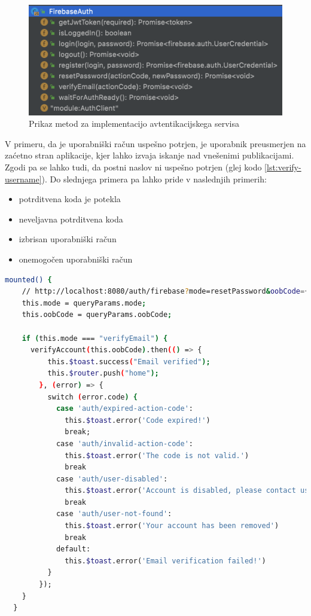 \documentclass[a4paper, 12pt]{book}
\newenvironment{myitemize}
{ \begin{itemize}
    \setlength{\itemsep}{2pt}
    \setlength{\parskip}{0pt}
    \setlength{\parsep}{2pt}     }
{ \end{itemize}                  }
\begin{document}
\begin{figure}[h]
\begin{center}
\includegraphics[width=1\textwidth]{slike/firebase_auth.png}
\end{center}
\caption{ Prikaz metod za implementacijo avtentikacijskega servisa }
\label{auth-methods}
\end{figure}

V primeru, da je uporabniški račun uspešno potrjen, je uporabnik preusmerjen na zaćetno stran aplikacije, kjer lahko izvaja iskanje nad vnešenimi publikacijami. Zgodi pa se lahko tudi, da postni naslov ni uspešno potrjen (glej kodo \ref{lst:verify-username}). Do slednjega primera pa lahko pride v naslednjih primerih:
\begin{myitemize}
  \item potrditvena koda je potekla
  \item neveljavna potrditvena koda
  \item izbrisan uporabniški račun
  \item onemogočen uporabniški račun
\end{myitemize}

\begin{lstlisting}[language=bash, style=mystyle,caption={Primer kode, za verificiranje uporabnika},label=lst:verify-username]
  mounted() {
    // http://localhost:8080/auth/firebase?mode=resetPassword&oobCode={code}
    this.mode = queryParams.mode;
    this.oobCode = queryParams.oobCode;

    if (this.mode === "verifyEmail") {
      verifyAccount(this.oobCode).then(() => {
          this.$toast.success("Email verified");
          this.$router.push("home");
        }, (error) => {
          switch (error.code) {
            case 'auth/expired-action-code':
              this.$toast.error('Code expired!')
              break;
            case 'auth/invalid-action-code':
              this.$toast.error('The code is not valid.')
              break
            case 'auth/user-disabled':
              this.$toast.error('Account is disabled, please contact us at support@example.com')
              break
            case 'auth/user-not-found':
              this.$toast.error('Your account has been removed')
              break
            default:
              this.$toast.error('Email verification failed!')
          }
        });
    }
  }
\end{lstlisting}
\end{document}
